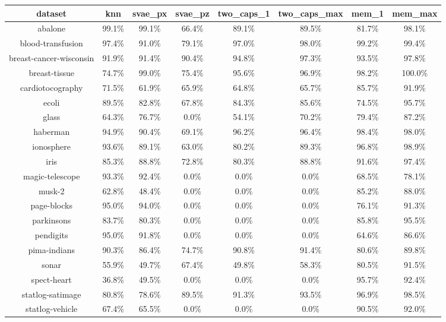 \begin{table} 
 \center 
 \begin{tabular}[h]{c c c c c c c c } 
  dataset & knn & svae_px & svae_pz & two_caps_1 & two_caps_max & mem_1 & mem_max  \\ 
  \hline 
  abalone & 99.1\% & 99.1\% & 66.4\% & 89.1\% & 89.5\% & 81.7\% & 98.1\%  \\ 
  blood-transfusion & 97.4\% & 91.0\% & 79.1\% & 97.0\% & 98.0\% & 99.2\% & 99.4\%  \\ 
  breast-cancer-wisconsin & 91.9\% & 91.4\% & 90.4\% & 94.8\% & 97.3\% & 93.5\% & 97.8\%  \\ 
  breast-tissue & 74.7\% & 99.0\% & 75.4\% & 95.6\% & 96.9\% & 98.2\% & 100.0\%  \\ 
  cardiotocography & 71.5\% & 61.9\% & 65.9\% & 64.8\% & 65.7\% & 85.7\% & 91.9\%  \\ 
  ecoli & 89.5\% & 82.8\% & 67.8\% & 84.3\% & 85.6\% & 74.5\% & 95.7\%  \\ 
  glass & 64.3\% & 76.7\% & 0.0\% & 54.1\% & 70.2\% & 79.4\% & 87.2\%  \\ 
  haberman & 94.9\% & 90.4\% & 69.1\% & 96.2\% & 96.4\% & 98.4\% & 98.0\%  \\ 
  ionosphere & 93.6\% & 89.1\% & 63.0\% & 80.2\% & 89.3\% & 96.8\% & 98.9\%  \\ 
  iris & 85.3\% & 88.8\% & 72.8\% & 80.3\% & 88.8\% & 91.6\% & 97.4\%  \\ 
  magic-telescope & 93.3\% & 92.4\% & 0.0\% & 0.0\% & 0.0\% & 68.5\% & 78.1\%  \\ 
  musk-2 & 62.8\% & 48.4\% & 0.0\% & 0.0\% & 0.0\% & 85.2\% & 88.0\%  \\ 
  page-blocks & 95.0\% & 94.0\% & 0.0\% & 0.0\% & 0.0\% & 76.1\% & 91.3\%  \\ 
  parkinsons & 83.7\% & 80.3\% & 0.0\% & 0.0\% & 0.0\% & 85.8\% & 95.5\%  \\ 
  pendigits & 95.0\% & 91.8\% & 0.0\% & 0.0\% & 0.0\% & 64.6\% & 86.6\%  \\ 
  pima-indians & 90.3\% & 86.4\% & 74.7\% & 90.8\% & 91.4\% & 80.6\% & 89.8\%  \\ 
  sonar & 55.9\% & 49.7\% & 67.4\% & 49.8\% & 58.3\% & 80.5\% & 91.5\%  \\ 
  spect-heart & 36.8\% & 49.5\% & 0.0\% & 0.0\% & 0.0\% & 95.7\% & 92.4\%  \\ 
  statlog-satimage & 80.8\% & 78.6\% & 89.5\% & 91.3\% & 93.5\% & 96.9\% & 98.5\%  \\ 
  statlog-vehicle & 67.4\% & 65.5\% & 0.0\% & 0.0\% & 0.0\% & 90.5\% & 92.0\%  \\ 

\end{tabular}
\end{table}
